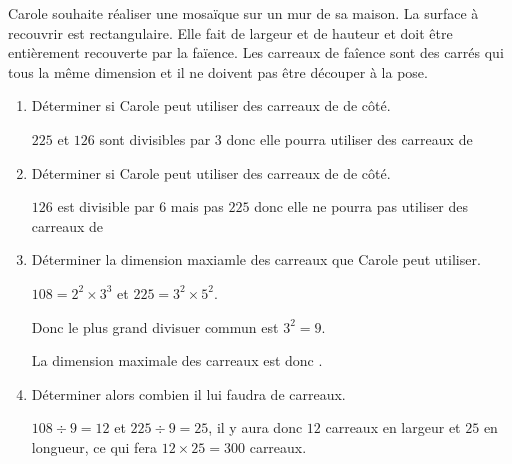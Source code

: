     Carole souhaite réaliser une mosaïque sur un mur de sa maison. La surface à recouvrir est rectangulaire.
    Elle fait  de largeur et  de hauteur et doit être entièrement recouverte par la faïence.
    Les carreaux de faîence sont des carrés qui tous la même dimension et il ne doivent pas être découper à la pose.

    \begin{enumerate}
        \item Déterminer si Carole peut utiliser des carreaux de  de côté.

        {\color{red} $225$ et $126$ sont divisibles par $3$ donc elle pourra utiliser des carreaux de }
        \item Déterminer si Carole peut utiliser des carreaux de  de côté.

        {\color{red} $126$ est divisible par $6$ mais pas $225$ donc elle ne pourra pas utiliser des carreaux de }
        \item Déterminer la dimension maxiamle des carreaux que Carole peut utiliser.

        {\color{red} $108 = 2^2\times 3^3$ et $225=3^2\times 5^2$.

        Donc le plus grand divisuer commun est $3^2=9$.

        La dimension maximale des carreaux est donc .
        }
        \item Déterminer alors combien il lui faudra de carreaux.

        {\color{red} $108\div 9 = 12$ et $225\div 9 = 25$, il y aura donc $12$ carreaux en largeur et $25$ en longueur, ce qui fera $12\times 25 = 300$ carreaux.}
    \end{enumerate}
